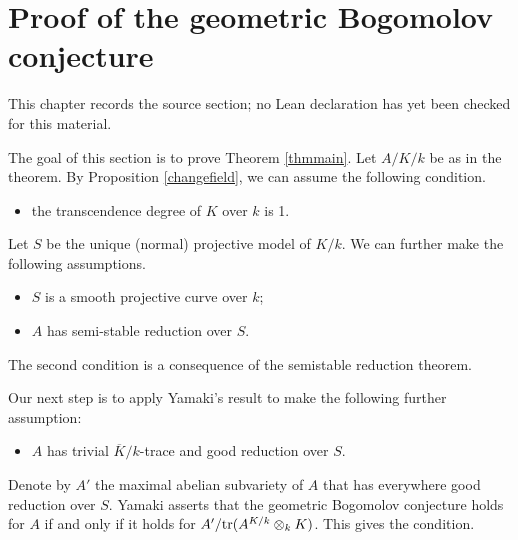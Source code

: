 \chapter{Proof of the geometric Bogomolov conjecture}
\label{geometric-bogomolov-conjecture-arbitrary-characteristics-chapter-05}

\begin{remark}
\label{geometric-bogomolov-conjecture-arbitrary-characteristics-chapter-05-source}
This chapter records the source section; no Lean declaration has yet been checked for this material.
\notready
\end{remark}

\label{sec final}

The goal of this section is to prove Theorem \ref{thmmain}.
Let $A/K/k$ be as in the theorem.
By Proposition \ref{changefield}, we can assume the following condition.
\begin{itemize}
\item[(a)] the transcendence degree of $K$ over $k$ is 1.
\end{itemize}
Let $S$ be the unique (normal) projective model of $K/k$.
We can further make the following assumptions.
\begin{itemize}
\item[(b)] $S$ is a smooth projective curve over $k$;
\item[(c)] $A$ has semi-stable reduction over $S$.
\end{itemize}
The second condition is a consequence of the semistable reduction theorem.

Our next step is to apply Yamaki's result to make the following further assumption:
\begin{itemize}
\item[(d)] $A$ has trivial $\overline K/k$-trace and good reduction over $S$.
\end{itemize}
Denote by $A'$ the maximal abelian subvariety of $A$ that has everywhere good reduction over $S$.
Yamaki \cite[Theorem 1.5]{Yamaki2016a} asserts that the geometric Bogomolov conjecture holds for $A$ if and only if it holds for $A'/{\rm tr}(A^{K/k}\otimes_kK)$.
This gives the condition.

